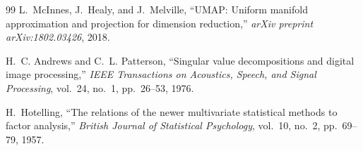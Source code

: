 \documentclass[conference]{IEEEtran}
\begin{document}
\begin{thebibliography}{99}
L.~McInnes, J.~Healy, and J.~Melville, ``UMAP: Uniform manifold approximation and projection for dimension reduction,'' \textit{arXiv preprint arXiv:1802.03426}, 2018.

H.~C. Andrews and C.~L. Patterson, ``Singular value decompositions and digital image processing,'' \textit{IEEE Transactions on Acoustics, Speech, and Signal Processing}, vol.~24, no.~1, pp.~26--53, 1976.

H.~Hotelling, ``The relations of the newer multivariate statistical methods to factor analysis,'' \textit{British Journal of Statistical Psychology}, vol.~10, no.~2, pp.~69--79, 1957.

\end{thebibliography}
\end{document}
